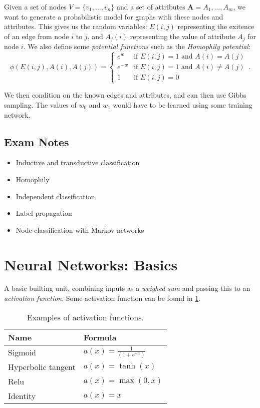 Given a set of nodes $V= \{v_1, \dots, v_n\}$ and a set of attributes $\mathbf{A} = A_1, \dots, A_m$, we want to generate a probabilistic model for graphs with these nodes and attributes.
This gives us the random variables: $E(i, j)$ representing the exitence of an edge from node $i$ to $j$, and $A_j(i)$ representing the value of attribute $A_j$ for node $i$.
We also define some \emph{potential functions} such as the \emph{Homophily potential}:
\[
    \phi(E(i,j), A(i), A(j)) = \left\{
        \begin{array}{ll}
            e^w & \text{if $E(i,j) = 1$ and $A(i)= A(j)$} \\
            e^{-w} & \text{if $E(i,j)= 1$ and $A(i) \neq A(j)$} \\
            1 & \text{if $E(i,j) = 0$}
        \end{array}
        \right.\,.
\]

We then condition on the known edges and attributes, and can then use Gibbs sampling.
The values of $w_0$ and $w_1$ would have to be learned using some training network.

\subsection{Exam Notes}

\begin{itemize}
    \item Inductive and transductive classification
    \item Homophily
    \item Independent classification
    \item Label propagation
    \item Node classification with Markov networks
\end{itemize}

\section{Neural Networks: Basics}

A basic builting unit, combining inputs as a \emph{weighed sum} and passing this to an \emph{activation function}.
Some activation function can be found in \cref{tab:act}.

\begin{table}[h]
    \centering
    \begin{tabular}{ll}
        \toprule
        Name & Formula \\ \midrule
        Sigmoid & $a(x)= \frac 1 {(1 + e^{-x})}$ \\
        Hyperbolic tangent & $a(x)= \tanh(x)$ \\
        Relu & $a(x) = \max(0, x)$ \\
        Identity & $a(x) = x$ \\ \bottomrule
    \end{tabular}
    \caption{Examples of activation functions.}
    \label{tab:act}
\end{table}

